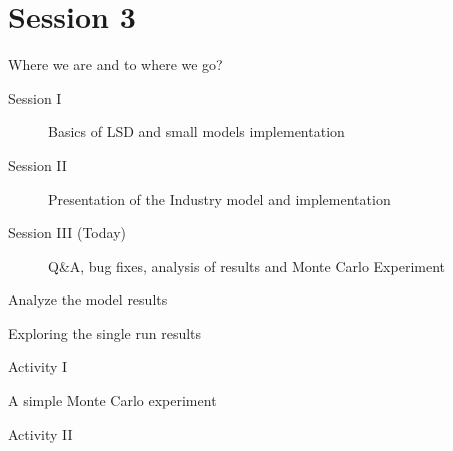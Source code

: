\documentclass[bigger,aspectratio=169]{beamer}
\begin{document}
\section{Session 3}
\label{sec:org524e27f}

\begin{frame}[label={sec:orgabc0342}]{Where we are and to where we go?}
\begin{description}
\item[{Session I}] Basics of LSD and small models implementation
\item[{Session II}] Presentation of the Industry model and implementation
\item[{Session III (Today)}] Q\&A, bug fixes, analysis of results and Monte Carlo Experiment
\end{description}
\end{frame}
\begin{frame}[label={sec:orgb4b4132}]{Analyze the model results}
\end{frame}

\begin{frame}[label={sec:org6f09abe}]{Exploring the single run results}
\end{frame}

\begin{frame}[label={sec:org2e07f49}]{Activity I}
\end{frame}

\begin{frame}[label={sec:org538c980}]{A simple Monte Carlo experiment}
\end{frame}

\begin{frame}[label={sec:org492bfa7}]{Activity II}
\end{frame}
\end{document}
